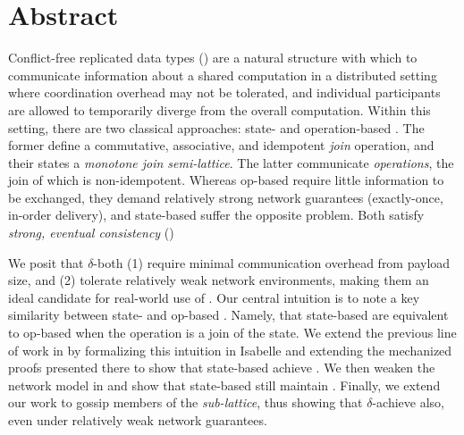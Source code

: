 \chapter*{Abstract}

Conflict-free replicated data types (\CRDTs) are a natural structure with which
to communicate information about a shared computation in a distributed setting
where coordination overhead may not be tolerated, and individual participants
are allowed to temporarily diverge from the overall computation.  Within this
setting, there are two classical approaches: state- and operation-based \CRDTs.
The former define a commutative, associative, and idempotent \textit{join}
operation, and their states a \textit{monotone join semi-lattice}. The latter
communicate \textit{operations}, the join of which is non-idempotent. Whereas
op-based \CRDTs require little information to be exchanged, they demand
relatively strong network guarantees (exactly-once, in-order delivery), and
state-based \CRDTs suffer the opposite problem. Both satisfy \textit{strong,
eventual consistency} (\SEC)

We posit that $\delta$-\CRDTs both (1) require minimal communication overhead
from payload size, and (2) tolerate relatively weak network environments, making
them an ideal candidate for real-world use of \CRDTs. Our central intuition is
to note a key similarity between state- and op-based \CRDTs. Namely, that
state-based \CRDTs are equivalent to op-based \CRDTs when the operation is a
join of the state. We extend the previous line of work in \cite{gomes17} by
formalizing this intuition in Isabelle and extending the mechanized proofs
presented there to show that state-based \CRDTs achieve \SEC. We then weaken the
network model in \cite{gomes17} and show that state-based \CRDTs still maintain
\SEC. Finally, we extend our work to gossip members of the \textit{sub-lattice},
thus showing that $\delta$-\CRDTs achieve \SEC also, even under relatively weak
network guarantees.
